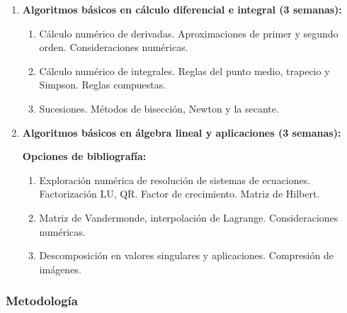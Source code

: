 \begin{refsection}
\begin{enumerate}
\item \textbf{Algoritmos básicos en cálculo diferencial e integral (3 semanas):}
\begin{enumerate} 
    \item Cálculo numérico de derivadas. Aproximaciones de primer y segundo orden. Consideraciones numéricas. \cite[Ejercicio 3.18]{langtangen_primer_2016}
    \item Cálculo numérico de integrales. Reglas del punto medio, trapecio y Simpson. Reglas compuestas. \cite[Sección 3.4.2, Ejercicio 3.6, 3.7, 3.8, 3.12]{langtangen_primer_2016}
    \item Sucesiones. Métodos de bisección, Newton y la secante. \cite[Sección A.1.10,Ejercicio A.10, A. 11]{langtangen_primer_2016}
\end{enumerate}

\item \textbf{Algoritmos básicos en álgebra lineal y aplicaciones (3 semanas):} 

\textbf{Opciones de bibliografía:} \cite{trefethen97}
\begin{enumerate}
    \item Exploración numérica de resolución de sistemas de ecuaciones. Factorización LU, QR. Factor de crecimiento. Matriz de Hilbert.
    \item Matriz de Vandermonde, interpolación de Lagrange. Consideraciones numéricas.
    \item Descomposición en valores singulares y aplicaciones. Compresión de imágenes. 
\end{enumerate}

\end{enumerate}

\subsubsection*{Metodología}


\end{refsection}

